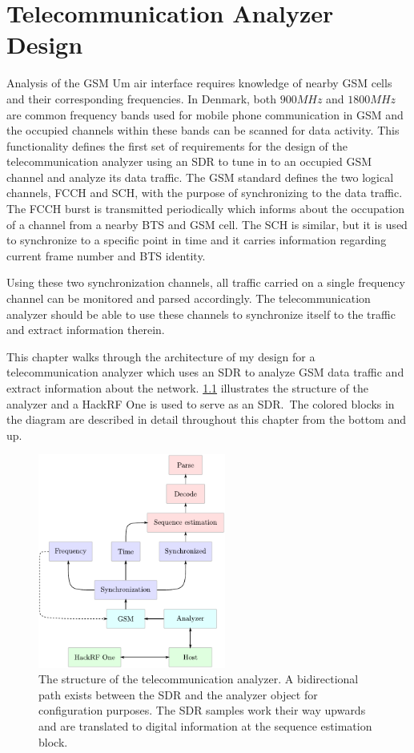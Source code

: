 \chapter{Telecommunication Analyzer Design}
\label{cha:design}
Analysis of the \gls{GSM} Um air interface requires knowledge of
nearby \gls{GSM} cells and their corresponding frequencies. In
Denmark, both $900\si{MHz}$ and $1800\si{MHz}$ are common frequency
bands used for mobile phone communication in \gls{GSM} and the
occupied channels within these bands can be scanned for data
activity. This functionality defines the first set of requirements for
the design of the telecommunication analyzer using an \gls{SDR} to
tune in to an occupied \gls{GSM} channel and analyze its data
traffic. The \gls{GSM} standard defines the two logical channels,
\gls{FCCH} and \gls{SCH}, with the purpose of synchronizing to the
data traffic. The \gls{FCCH} burst is transmitted periodically which
informs about the occupation of a channel from a nearby \gls{BTS} and
\gls{GSM} cell. The \gls{SCH} is similar, but it is used to
synchronize to a specific point in time and it carries information
regarding current frame number and \gls{BTS} identity.

Using these two synchronization channels, all traffic carried on a
single frequency channel can be monitored and parsed accordingly. The
telecommunication analyzer should be able to use these channels to
synchronize itself to the traffic and extract information therein.

This chapter walks through the architecture of my design for a
telecommunication analyzer which uses an \gls{SDR} to analyze
\gls{GSM} data traffic and extract information about the
network. \cref{fig:implementation_design} illustrates the structure of
the analyzer and a HackRF One is used to serve as an \gls{SDR}.\ The
colored blocks in the diagram are described in detail throughout this
chapter from the bottom and up.

\begin{figure}
  \centering
  \includegraphics[width=0.55\textwidth]{figures/implementation_design}
  \caption{The structure of the telecommunication analyzer. A
    bidirectional path exists between the \gls{SDR} and the analyzer
    object for configuration purposes. The \gls{SDR} samples work
    their way upwards and are translated to digital information at the
    sequence estimation block.}
  \label{fig:implementation_design}
\end{figure}

